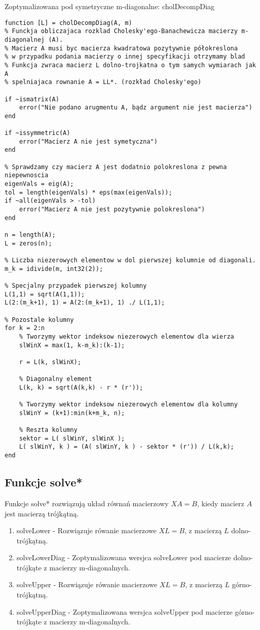 \documentclass[12pt]{article}
\begin{document}
Zoptymalizowana pod symetryczne m-diagonalne: cholDecompDiag 
\begin{lstlisting}
function [L] = cholDecompDiag(A, m)
% Funckja obliczajaca rozklad Cholesky'ego-Banachewicza macierzy m-diagonalnej (A).
% Macierz A musi byc macierza kwadratowa pozytywnie półokreslona
% w przypadku podania macierzy o innej specyfikacji otrzymamy blad
% Funkcja zwraca macierz L dolno-trojkatna o tym samych wymiarach jak A 
% spelniajaca rownanie A = LL*. (rozkład Cholesky'ego)

if ~ismatrix(A)
    error("Nie podano arugmentu A, bądz argument nie jest macierza")
end

if ~issymmetric(A)
    error("Macierz A nie jest symetyczna")
end

% Sprawdzamy czy macierz A jest dodatnio polokreslona z pewna niepewnoscia
eigenVals = eig(A); 
tol = length(eigenVals) * eps(max(eigenVals)); 
if ~all(eigenVals > -tol)
    error("Macierz A nie jest pozytywnie polokreslona")
end

n = length(A);
L = zeros(n);

% Liczba niezerowych elementow w dol pierwszej kolumnie od diagonali.
m_k = idivide(m, int32(2)); 

% Specjalny przypadek pierwszej kolumny
L(1,1) = sqrt(A(1,1));
L(2:(m_k+1), 1) = A(2:(m_k+1), 1) ./ L(1,1);

% Pozostale kolumny
for k = 2:n
    % Tworzymy wektor indeksow niezerowych elementow dla wierza
    slWinX = max(1, k-m_k):(k-1);
    
    r = L(k, slWinX);

    % Diagonalny element
    L(k, k) = sqrt(A(k,k) - r * (r'));

    % Tworzymy wektor indeksow niezerowych elementow dla kolumny
    slWinY = (k+1):min(k+m_k, n);

    % Reszta kolumny
    sektor = L( slWinY, slWinX );
    L( slWinY, k ) = (A( slWinY, k ) - sektor * (r')) / L(k,k);
end
\end{lstlisting}

\subsection{Funkcje solve*}
Funkcje solve* rozwiązują układ równań macierzowy $XA = B$, kiedy macierz $A$ jest macierzą trójkątną.

\begin{enumerate}
    \item solveLower - Rozwiązuje rówanie macierzowe $XL = B$, z macierzą $L$ dolno-trójkątną.
    \item solveLowerDiag - Zoptymalizowana wersjca solveLower pod macierze dolno-trójkąte z macierzy m-diagonalnych. 
    \item solveUpper - Rozwiązuje rówanie macierzowe $XL = B$, z macierzą $L$ górno-trójkątną.
    \item solveUpperDiag - Zoptymalizowana wersjca solveUpper pod macierze górno-trójkąte z macierzy m-diagonalnych. 
\end{enumerate}
    
\end{document}
